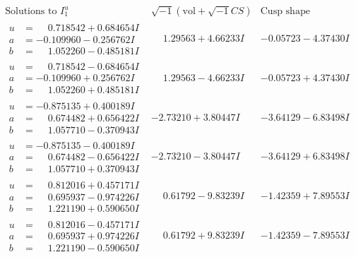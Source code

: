 \documentclass[1p]{elsarticle_modified}
\theoremstyle{definition}
\newcommand{\I}{\sqrt{-1}}
\begin{document}
$$\begin{array}{c|c|c}  
\text{Solutions to }I^u_{1}& \I (\text{vol} + \sqrt{-1}CS) & \text{Cusp shape}\\
 \hline 
\begin{aligned}
u &= \phantom{-}0.718542 + 0.684654 I \\
a &= -0.109960 - 0.256762 I \\
b &= \phantom{-}1.052260 - 0.485181 I\end{aligned}
 & \phantom{-}1.29563 + 4.66233 I & -0.05723 - 4.37430 I \\ \hline\begin{aligned}
u &= \phantom{-}0.718542 - 0.684654 I \\
a &= -0.109960 + 0.256762 I \\
b &= \phantom{-}1.052260 + 0.485181 I\end{aligned}
 & \phantom{-}1.29563 - 4.66233 I & -0.05723 + 4.37430 I \\ \hline\begin{aligned}
u &= -0.875135 + 0.400189 I \\
a &= \phantom{-}0.674482 + 0.656422 I \\
b &= \phantom{-}1.057710 - 0.370943 I\end{aligned}
 & -2.73210 + 3.80447 I & -3.64129 - 6.83498 I \\ \hline\begin{aligned}
u &= -0.875135 - 0.400189 I \\
a &= \phantom{-}0.674482 - 0.656422 I \\
b &= \phantom{-}1.057710 + 0.370943 I\end{aligned}
 & -2.73210 - 3.80447 I & -3.64129 + 6.83498 I \\ \hline\begin{aligned}
u &= \phantom{-}0.812016 + 0.457171 I \\
a &= \phantom{-}0.695937 - 0.974226 I \\
b &= \phantom{-}1.221190 + 0.590650 I\end{aligned}
 & \phantom{-}0.61792 - 9.83239 I & -1.42359 + 7.89553 I \\ \hline\begin{aligned}
u &= \phantom{-}0.812016 - 0.457171 I \\
a &= \phantom{-}0.695937 + 0.974226 I \\
b &= \phantom{-}1.221190 - 0.590650 I\end{aligned}
 & \phantom{-}0.61792 + 9.83239 I & -1.42359 - 7.89553 I \\ \hline\begin{aligned}

\end{aligned}
\end{array}$$
\end{document}
